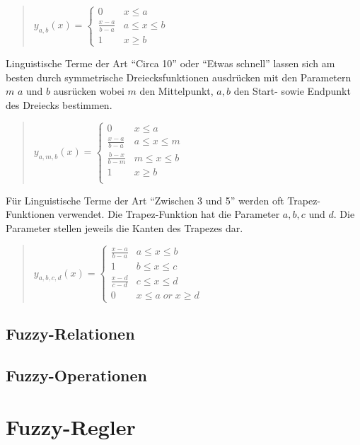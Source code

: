 \documentclass[12pt,a4paper,bibliography=totocnumbered,listof=totocnumbered]{scrartcl}
\theoremstyle{Umgebung}
\begin{document}
\begin{quotation}
$y_{a,b}(x)=\begin{cases}
0				& x \leq a \\
\frac{x-a}{b-a} & a \leq x \leq b \\
1 				& x \geq b 
\end{cases}$
\end{quotation}

Linguistische Terme der Art \enquote{Circa 10} oder \enquote{Etwas schnell} lassen sich am besten durch symmetrische Dreiecksfunktionen ausdrücken mit den Parametern $m$ $a$ und $b$ ausrücken wobei $m$ den Mittelpunkt, $a, b$ den Start- sowie Endpunkt des Dreiecks bestimmen.

\begin{quotation}
$y_{a,m,b}(x)=\begin{cases}
0				& x \leq a \\
\frac{x-a}{b-a} & a \leq x \leq m  \\
\frac{b-x}{b-m} & m \leq x \leq b  \\
1 				& x \geq b \\
\end{cases}$
\end{quotation}

Für Linguistische Terme der Art \enquote{Zwischen 3 und 5} werden oft Trapez-Funktionen verwendet. Die Trapez-Funktion hat die Parameter $a,b,c$ und $d$. Die Parameter stellen jeweils die Kanten des Trapezes dar.

\begin{quotation}
$y_{a,b,c,d}(x)=\begin{cases}
\frac{x-a}{b-a} & a \leq x \leq b  \\
1 				& b \leq x \leq c \\
\frac{x-d}{c-d} & c \leq x \leq d \\
0				& x \le a \; or \; x \ge d  
\end{cases}$
\end{quotation}



\subsection{Fuzzy-Relationen}

\subsection{Fuzzy-Operationen}

\section{Fuzzy-Regler}
\end{document}
